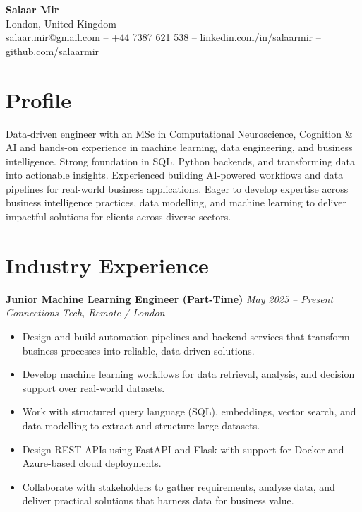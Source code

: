 \documentclass[a4paper,10pt]{article}
\begin{document}
\begin{center}
    {\LARGE \textbf{Salaar Mir}}\\[4pt]
    London, United Kingdom \\[2pt]
    \href{mailto:salaar.mir@gmail.com}{salaar.mir@gmail.com} \quad -- \quad
    +44 7387 621 538 \quad -- \quad
    \href{https://www.linkedin.com/in/salaarmir}{linkedin.com/in/salaarmir} \quad -- \quad
    \href{https://github.com/salaarmir}{github.com/salaarmir}
\end{center}

\section*{Profile}
Data-driven engineer with an MSc in Computational Neuroscience, Cognition \& AI and hands-on experience in machine learning, data engineering, and business intelligence. Strong foundation in SQL, Python backends, and transforming data into actionable insights. Experienced building AI-powered workflows and data pipelines for real-world business applications. Eager to develop expertise across business intelligence practices, data modelling, and machine learning to deliver impactful solutions for clients across diverse sectors.

\section*{Industry Experience}
\textbf{Junior Machine Learning Engineer (Part-Time)} \hfill \textit{May 2025 -- Present}\\
\textit{Connections Tech, Remote / London}
\begin{itemize}
    \item Design and build automation pipelines and backend services that transform business processes into reliable, data-driven solutions.
    \item Develop machine learning workflows for data retrieval, analysis, and decision support over real-world datasets.
    \item Work with structured query language (SQL), embeddings, vector search, and data modelling to extract and structure large datasets.
    \item Design REST APIs using FastAPI and Flask with support for Docker and Azure-based cloud deployments.
    \item Collaborate with stakeholders to gather requirements, analyse data, and deliver practical solutions that harness data for business value.
\end{itemize}
\end{document}
